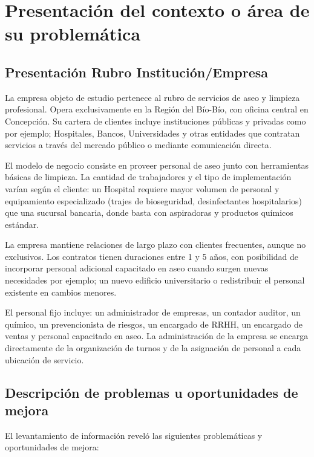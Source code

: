 \documentclass[12pt,a4paper]{report}
\begin{document}
\section{Presentación del contexto o área de su problemática}

\subsection{Presentación Rubro Institución/Empresa}

La empresa objeto de estudio pertenece al rubro de servicios de aseo y limpieza profesional. Opera exclusivamente en la Región del Bío-Bío, con oficina central en Concepción. Su cartera de clientes incluye instituciones públicas y privadas como por ejemplo; Hospitales, Bancos, Universidades y otras entidades que contratan servicios a través del mercado público o mediante comunicación directa.

El modelo de negocio consiste en proveer personal de aseo junto con herramientas básicas de limpieza. La cantidad de trabajadores y el tipo de implementación varían según el cliente: un Hospital requiere mayor volumen de personal y equipamiento especializado (trajes de bioseguridad, desinfectantes hospitalarios) que una sucursal bancaria, donde basta con aspiradoras y productos químicos estándar.

La empresa mantiene relaciones de largo plazo con clientes frecuentes, aunque no exclusivos. Los contratos tienen duraciones entre 1 y 5 años, con posibilidad de incorporar personal adicional capacitado en aseo cuando surgen nuevas necesidades por ejemplo; un nuevo edificio universitario o redistribuir el personal existente en cambios menores.

El personal fijo incluye: un administrador de empresas, un contador auditor, un químico, un prevencionista de riesgos, un encargado de RRHH, un encargado de ventas y personal capacitado en aseo. La administración de la empresa se encarga directamente de la organización de turnos y de la asignación de personal a cada ubicación de servicio.

\subsection{Descripción de problemas u oportunidades de mejora}

El levantamiento de información reveló las siguientes problemáticas y oportunidades de mejora:
\end{document}
